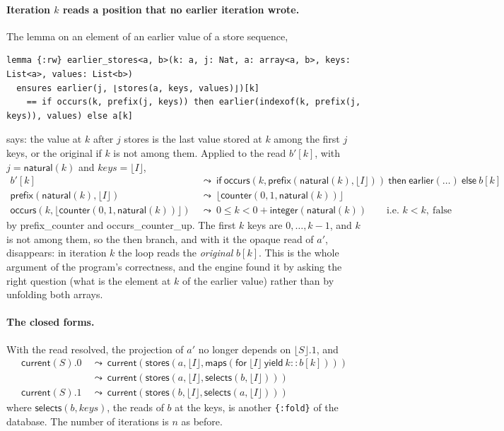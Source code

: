 \documentclass[11pt,a4paper]{article}
\newcommand{\bl}[1]{\lfloor #1\rfloor}                       %
\newcommand{\mapc}[2]{\mathsf{maps}(\mathsf{for}\ #1\ \mathsf{yield}\ #2)}
\newcommand{\cnt}{\mathsf{counter}}
\newcommand{\cur}{\mathsf{current}}
\newcommand{\ear}{\mathsf{earlier}}
\newcommand{\intf}{\mathsf{integer}}
\newcommand{\natf}{\mathsf{natural}}
\newcommand{\stores}{\mathsf{stores}}
\newcommand{\selects}{\mathsf{selects}}
\newcommand{\occurs}{\mathsf{occurs}}
\newcommand{\prefix}{\mathsf{prefix}}
\newcommand{\ite}[3]{\mathsf{if}\ #1\ \mathsf{then}\ #2\ \mathsf{else}\ #3}
\newcommand{\lemma}[1]{\textsf{#1}}
\newcommand{\rw}{\ \leadsto\ }
\begin{document}
\paragraph{Iteration $k$ reads a position that no earlier iteration wrote.} The lemma on an element of an earlier
value of a store sequence,
\begin{lstlisting}
lemma {:rw} earlier_stores<a, b>(k: a, j: Nat, a: array<a, b>, keys: List<a>, values: List<b>)
  ensures earlier(j, ⌊stores(a, keys, values)⌋)[k]
    == if occurs(k, prefix(j, keys)) then earlier(indexof(k, prefix(j, keys)), values) else a[k]
\end{lstlisting}
says: the value at $k$ after $j$ stores is the last value stored at $k$ among the first $j$ keys, or the original if
$k$ is not among them. Applied to the read $b'[k]$, with $j = \natf(k)$ and $keys = \bl{I}$,
\begin{align*}
b'[k] &\rw \ite{\occurs(k, \prefix(\natf(k), \bl{I}))}{\ear(\ldots)}{b[k]} \\
\prefix(\natf(k), \bl{I}) &\rw \bl{\cnt(0, 1, \natf(k))} \\
\occurs(k, \bl{\cnt(0, 1, \natf(k))}) &\rw 0 \le k < 0 + \intf(\natf(k)) \qquad\text{i.e. } k < k,\ \text{false}
\end{align*}
by \lemma{prefix\_counter} and \lemma{occurs\_counter\_up}. The first $k$ keys are $0, \ldots, k-1$, and $k$ is not
among them, so the \textsf{then} branch, and with it the opaque read of $a'$, disappears: in iteration $k$ the loop
reads the \emph{original} $b[k]$. This is the whole argument of the program's correctness, and the engine found it by
asking the right question (what is the element at $k$ of the earlier value) rather than by unfolding both arrays.

\paragraph{The closed forms.} With the read resolved, the projection of $a'$ no longer depends on $\bl{S}.1$, and
\begin{align*}
\cur(S).0 &\rw \cur(\stores(a, \bl{I}, \mapc{\bl{I}}{k :: b[k]})) \\
&\rw \cur(\stores(a, \bl{I}, \selects(b, \bl{I}))) \\
\cur(S).1 &\rw \cur(\stores(b, \bl{I}, \selects(a, \bl{I})))
\end{align*}
where $\selects(b, keys)$, the reads of $b$ at the keys, is another \lstinline|{:fold}| of the database. The number
of iterations is $n$ as before.
\end{document}
